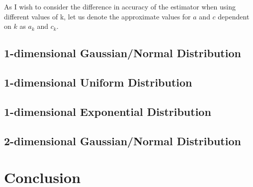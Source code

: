 \documentclass{report}
\begin{document}
As I wish to consider the difference in accuracy of the estimator when using different values of k, let us denote the approximate values for $a$ and $c$ dependent on $k$ as $a_{k}$ and $c_{k}$.


\section{1-dimensional Gaussian/Normal Distribution}

\section{1-dimensional Uniform Distribution}

\section{1-dimensional Exponential Distribution}

\section{2-dimensional Gaussian/Normal Distribution}


\chapter{Conclusion}




\end{document}
